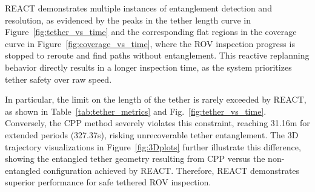 \ac{REACT} demonstrates multiple instances of entanglement detection and resolution, as evidenced by the peaks in the tether length curve in Figure~\ref{fig:tether_vs_time} and the corresponding flat regions in the coverage curve in Figure~\ref{fig:coverage_vs_time}, where the \ac{ROV} inspection progress is stopped to reroute and find paths without entanglement. This reactive replanning behavior directly results in a longer inspection time, as the system prioritizes tether safety over raw speed.

In particular, the limit on the length of the tether is rarely exceeded by \ac{REACT}, as shown in Table~\ref{tab:tether_metrics} and Fig.~\ref{fig:tether_vs_time}. Conversely, the \ac{CPP} method severely violates this constraint, reaching 31.16m for extended periods (327.37s), risking unrecoverable tether entanglement. The 3D trajectory visualizations in Figure~\ref{fig:3Dplots} further illustrate this difference, showing the entangled tether geometry resulting from \ac{CPP} versus the non-entangled configuration achieved by \ac{REACT}. Therefore, \ac{REACT} demonstrates superior performance for safe tethered \ac{ROV} inspection.

